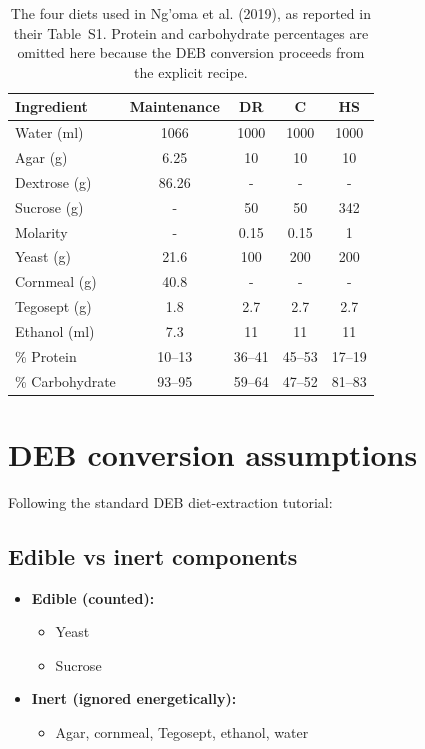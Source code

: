 \documentclass[11pt]{article}
\begin{document}
\begin{table}[h]
  \centering
  \begin{tabular}{lcccc}
    \toprule
    Ingredient & {Maintenance} & {DR} & {C} & {HS} \\
    \midrule
    Water (ml)       & 1066  & 1000 & 1000 & 1000 \\
    Agar (g)         & 6.25  & 10   & 10   & 10   \\
    Dextrose (g)     & 86.26 & -    & -    & -    \\
    Sucrose (g)      & -     & 50   & 50   & 342  \\
    Molarity         & -     & 0.15 & 0.15 & 1    \\
    Yeast (g)        & 21.6  & 100  & 200  & 200  \\
    Cornmeal (g)     & 40.8  & -    & -    & -    \\
    Tegosept (g)     & 1.8   & 2.7  & 2.7  & 2.7  \\
    Ethanol (ml)     & 7.3   & 11   & 11   & 11   \\
    \% Protein       & 10--13 & 36--41 & 45--53 & 17--19 \\
    \% Carbohydrate  & 93--95 & 59--64 & 47--52 & 81--83 \\
    \bottomrule
  \end{tabular}
  \caption{The four diets used in Ng'oma et al. (2019), as reported in their Table~S1. Protein and carbohydrate percentages are omitted here because the DEB conversion proceeds from the explicit recipe.}
\end{table}

\section{DEB conversion assumptions}

Following the standard DEB diet-extraction tutorial:

\subsection{Edible vs inert components}
\begin{itemize}
  \item \textbf{Edible (counted):}
  \begin{itemize}
    \item Yeast
    \item Sucrose
  \end{itemize}
  \item \textbf{Inert (ignored energetically):}
  \begin{itemize}
    \item Agar, cornmeal, Tegosept, ethanol, water
  \end{itemize}
\end{itemize}
\end{document}
